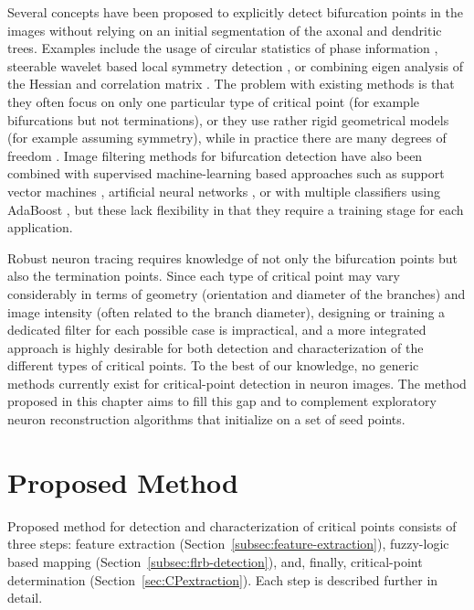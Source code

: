 Several concepts have been proposed to explicitly detect bifurcation points in the images without relying on an initial segmentation of the axonal and dendritic trees. Examples include the usage of circular statistics of phase information \cite{obaraa2012contrast}, steerable wavelet based local symmetry detection \cite{puspoki2013detection}, or combining eigen analysis of the Hessian and correlation matrix \cite{su2012junction}. The problem with existing methods is that they often focus on only one particular type of critical point (for example bifurcations but not terminations), or they use rather rigid geometrical models (for example assuming symmetry), while in practice there are many degrees of freedom \cite{michaelis1994junction}. Image filtering methods for bifurcation detection have also been combined with supervised machine-learning based approaches such as support vector machines \cite{turetken2011automated}, artificial neural networks \cite{bevilacqua2009comparison}, or with multiple classifiers using AdaBoost \cite{zhou2007vascular}, but these lack flexibility in that they require a training stage for each application.

Robust neuron tracing requires knowledge of not only the bifurcation points but also the termination points. Since each type of critical point may vary considerably in terms of geometry (orientation and diameter of the branches) and image intensity (often related to the branch diameter), designing or training a dedicated filter for each possible case is impractical, and a more integrated approach is highly desirable for both detection and characterization of the different types of critical points. To the best of our knowledge, no generic methods currently exist for critical-point detection in neuron images. The method proposed in this chapter aims to fill this gap and to complement exploratory neuron reconstruction algorithms that initialize on a set of seed points.

\section{Proposed Method}
\label{sec:proposed-method}
Proposed method for detection and characterization of critical points consists of three steps: feature extraction (Section~\ref{subsec:feature-extraction}), fuzzy-logic based mapping (Section~\ref{subsec:flrb-detection}), and, finally, critical-point determination (Section~\ref{sec:CPextraction}). Each step is described further in detail. 

